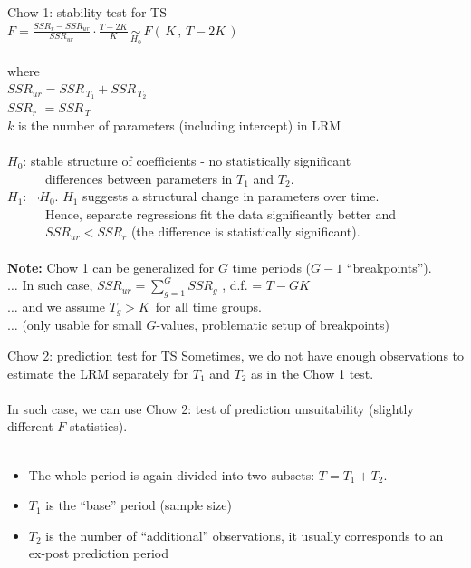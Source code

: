 \documentclass{beamer}
\begin{document}
\begin{frame}{Chow 1: stability test for TS}
~\\
$F = \frac{\textit{SSR}_{r}-\textit{SSR}_{ur}}{\textit{SSR}_{ur}}
   \cdot \frac{T-2K}{K} \,
   \underset{H_0}{\sim} \,
   F(\,K \,,\, T\!-\!2K \, ) $ \\
~ \\
where\\
$\textit{SSR}_{ur} = \textit{SSR}_{\,T_1} + \textit{SSR}_{\,T_2} $\\
$\textit{SSR}_{r} \,\,= \textit{SSR}_{\,T}$\\
$k$ is the number of parameters (including intercept) in LRM\\
~ \\
$H_0$: stable structure of coefficients - no statistically significant\\ 
~~~~~~differences between parameters in $T_1$ and $T_2$.\\
$H_1$: $\neg H_0$. $H_1$ suggests a structural change in parameters over time.\\ 
~~~~~~Hence, separate regressions fit the data significantly better and\\
~~~~~~$\textit{SSR}_{ur} < \textit{SSR}_{r}$ (the difference is statistically significant).\\
~ \\
\footnotesize{
\textbf{Note:} Chow 1 can be generalized for $G$ time periods ($G-1$ ``breakpoints'').\\
$\dots$ In such case, $\textit{SSR}_{ur}= \sum_{g=1}^G \! \textit{SSR}_{g} $ , d.f. = $T-GK$ \\
$\dots$ and we assume $T_g > K \,$ for all time groups.\\
$\dots$ (only usable for small $G$-values, problematic setup of breakpoints)
}
\end{frame}
\begin{frame}{Chow 2: prediction test for TS}
Sometimes, we do not have enough observations to estimate the LRM separately for $T_1$ and $T_2$ as in the Chow 1 test.\\
~\\
In such case, we can use Chow 2: test of prediction unsuitability (slightly different $F$-statistics). \\
~\\
\begin{itemize}
\item The whole period is again divided into two subsets: $T = T_1 + T_2$. 
\item $T_1$ is the ``base'' period (sample size)
\item $T_2$ is the number of ``additional'' observations, it usually corresponds to an ex-post prediction period
\end{itemize}
\end{frame}
\end{document}

